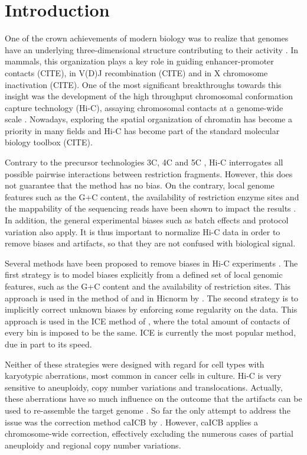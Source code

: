 \documentclass{bioinfo}
\begin{document}
\section{Introduction}

One of the crown achievements of modern biology was to realize that
genomes have an underlying three-dimensional structure contributing to
their activity \citep{rowley2016three}. In mammals, this organization
plays a key role in guiding enhancer-promoter contacts (CITE), in V(D)J
recombination (CITE) and in X chromosome inactivation (CITE). One of the
most significant breakthroughs towards this insight was the development of
the high throughput chromosomal conformation capture technology (Hi-C),
assaying chromosomal contacts at a genome-wide scale
\citep{lieberman2009comprehensive}. Nowadays, exploring the spatial
organization of chromatin has become a priority in many fields and
Hi-C has become part of the standard molecular biology toolbox (CITE).

Contrary to the precursor technologies 3C, 4C and 5C \citep{de2012decade},
Hi-C interrogates all possible pairwise interactions between restriction
fragments. However, this does not guarantee that the method has no bias.
On the contrary, local genome features such as the G+C content, the
availability of restriction enzyme sites and the mappability of the
sequencing reads have been shown to impact the results
\citep{yaffe2011probabilistic}. In addition, the general experimental
biases such as batch effects and protocol variation also apply. It is thus
important to normalize Hi-C data in order to remove biases and artifacts,
so that they are not confused with biological signal.

Several methods have been proposed to remove biases in Hi-C experiments
\citep{schmitt2016genome}. The first strategy is to model biases
explicitly from a defined set of local genomic features, such as the G+C
content and the availability of restriction sites. This approach is used
in the method of \cite{yaffe2011probabilistic} and in Hicnorm by
\cite{hu2012hicnorm}. The second strategy is to implicitly correct
unknown biases by enforcing some regularity on the data. This approach is
used in the ICE method of \cite{imakaev2012iterative}, where the total
amount of contacts of every bin is imposed to be the same. ICE is
currently the most popular method, due in part to its speed.

Neither of these strategies were designed with regard for cell types with
karyotypic aberrations, most common in cancer cells in culture.  Hi-C is
very sensitive to aneuploidy, copy number variations and translocations.
Actually, these aberrations have so much influence on the outcome that the
artifacts can be used to re-assemble the target genome
\citep{korbel2013genome}.  So far the only attempt to address the issue
was the correction method caICB by \cite{wu2016computational}. However,
caICB applies a chromosome-wide correction, effectively excluding the
numerous cases of partial aneuploidy and regional copy number variations.
\end{document}
